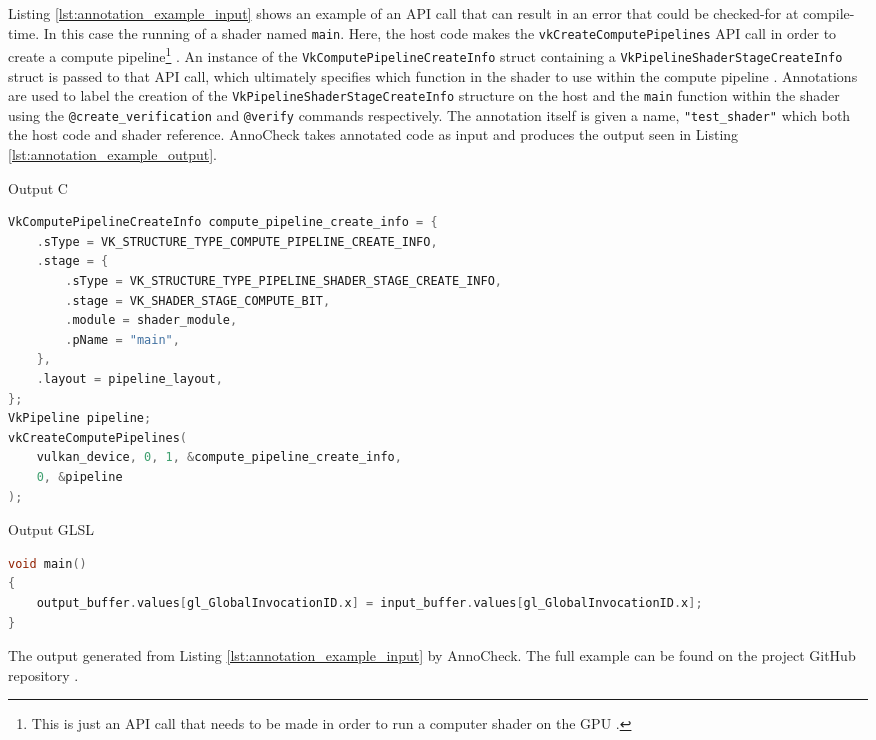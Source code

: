 \documentclass[a4paper,12pt,twoside,openright]{report}
\begin{document}
Listing \ref{lst:annotation_example_input} shows an example of an API call that
can result in an error that could be checked-for at compile-time. In this case
the running of a shader named \texttt{main}. Here, the host code makes the
\texttt{vkCreateComputePipelines} API call in order to create a compute
pipeline\footnote{This is just an API call that needs to be made in order to
run a computer shader on the GPU \cite{TODO}.} \cite{vkCreateComputePipelines}.
An instance of the \texttt{VkComputePipelineCreateInfo} struct containing a
\texttt{VkPipelineShaderStageCreateInfo} struct is passed to that API call,
which ultimately specifies which function in the shader to use within the
compute pipeline \cite{VkComputePipelineCreateInfo}
\cite{VkPipelineShaderStageCreateInfo}. Annotations are used to label the
creation of the \texttt{VkPipelineShaderStageCreateInfo} structure on the host
and the \texttt{main} function within the shader using the
\texttt{@create\_verification} and \texttt{@verify} commands respectively. The
annotation itself is given a name, \texttt{"test\_shader"} which both the host
code and shader reference. AnnoCheck takes annotated code as input and produces
the output seen in Listing \ref{lst:annotation_example_output}.

\begin{lstfloat}
\begin{center} Output C \end{center}
\begin{lstlisting}[language=C]
VkComputePipelineCreateInfo compute_pipeline_create_info = {
    .sType = VK_STRUCTURE_TYPE_COMPUTE_PIPELINE_CREATE_INFO,
    .stage = {
        .sType = VK_STRUCTURE_TYPE_PIPELINE_SHADER_STAGE_CREATE_INFO,
        .stage = VK_SHADER_STAGE_COMPUTE_BIT,
        .module = shader_module,
        .pName = "main",
    },
    .layout = pipeline_layout,
};
VkPipeline pipeline;
vkCreateComputePipelines(
    vulkan_device, 0, 1, &compute_pipeline_create_info,
    0, &pipeline
);
\end{lstlisting}
\begin{center} Output GLSL \end{center}
\begin{lstlisting}[language=C]
void main()
{
    output_buffer.values[gl_GlobalInvocationID.x] = input_buffer.values[gl_GlobalInvocationID.x];
}
\end{lstlisting}
\caption{The output generated from Listing \ref{lst:annotation_example_input}
by AnnoCheck. The full example can be found on the project GitHub repository
\cite{ProjectSource}.}
\label{lst:annotation_example_output}
\end{lstfloat}
\end{document}
